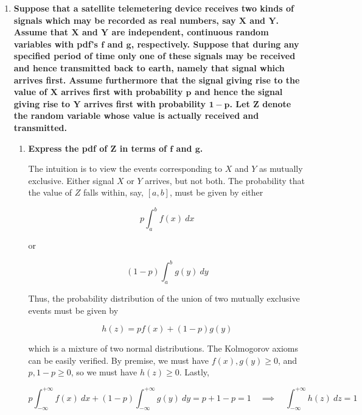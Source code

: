 \documentclass[10pt, oneside]{article}
\begin{document}
\begin{enumerate}[label=9.\arabic*]
\begin{enumerate}
	By the above,
	
	\[ P(X < 0) = \Phi(-1/2) = \boxed{ \frac{1}{2} - H(1/2) } \]
	\end{enumerate}

\newpage
\item  \begin{tcolorbox}[
  colback=Cerulean!5!white,
  colframe=Cerulean!75!black]
\textbf{Suppose that a satellite telemetering device receives two kinds of signals which may be recorded as real numbers, say $\bm{X}$ and $\bm{Y}$. Assume that $\bm{X}$ and $\bm{Y}$ are independent, continuous random variables with pdf's $\bm{f}$ and $\bm{g}$, respectively. Suppose that during any specified period of time only one of these signals may be received and hence transmitted back to earth, namely that signal which arrives first. Assume furthermore that the signal giving rise to the value of $\bm{X}$ arrives first with probability $\bm{p}$ and hence the signal giving rise to $\bm{Y}$ arrives first with probability $\bm{1-p}$. Let $\bm{Z}$ denote the random variable whose value is actually received and transmitted.}
\end{tcolorbox}

	\begin{enumerate}
	\item  \begin{tcolorbox}[
	  colback=Cerulean!5!white,
	  colframe=Cerulean!75!black]
	\textbf{Express the pdf of $\bm{Z}$ in terms of $\bm{f}$ and $\bm{g}$.}
	\end{tcolorbox}
	
	The intuition is to view the events corresponding to $X$ and $Y$ as mutually exclusive. Either signal $X$ or $Y$ arrives, but not both. The probability that the value of $Z$ falls within, say, $[a,b]$, must be given by either
	
	\[ p \int^b_a f(x) \ dx \]
	
	or
	
	\[ (1-p) \int^b_a g(y) \ dy \]
	
	Thus, the probability distribution of the union of two mutually exclusive events must be given by
	
	\[ \boxed{ h(z) = p f(x) + (1-p) g(y) } \]
	
	which is a mixture of two normal distributions. The Kolmogorov axioms can be easily verified. By premise, we must have $f(x), g(y) \geq 0$, and $p, 1-p \geq 0$, so we must have $h(z) \geq 0$. Lastly,
	
	\[ p \int^{+\infty}_{-\infty} f(x) \ dx + (1-p) \int^{+\infty}_{-\infty} g(y) \ dy = p + 1 - p = 1 \quad \implies \quad \int^{+\infty}_{-\infty} h(z) \ dz = 1 \]
	

\end{enumerate}
\end{enumerate}
\end{document}
